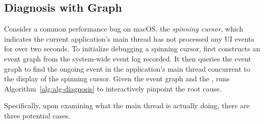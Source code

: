 \subsection{Diagnosis with Graph}\label{subsec:debug}



Consider a common performance bug on macOS, the \emph{spinning cursor},
which indicates the current application's main thread has not processed
any UI events for over two seconds.  To initialize debugging a spinning
cursor, \xxx first constructs an event graph from the system-wide event
log recorded.  It then queries the event graph to find the ongoing event
in the application's main thread concurrent to the display of the spinning
cursor.  Given the event graph and the \spinningnode, \xxx runs
Algorithm~\ref{alg:alg-diagnosis} to interactively pinpoint the root
cause.

Specifically, upon examining what the main thread is actually doing, there
are three potential cases.

